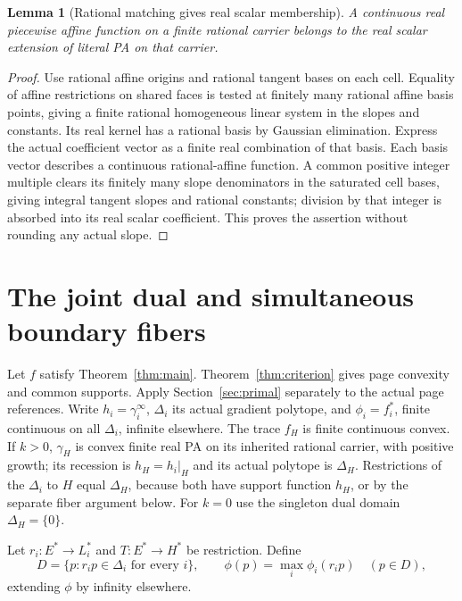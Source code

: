 \documentclass[11pt]{article}
\newtheorem{lemma}[theorem]{Lemma}
\begin{document}
\begin{lemma}[Rational matching gives real scalar membership]\label{lem:scalar}
A continuous real piecewise affine function on a finite rational carrier belongs to the real scalar extension of literal PA on that carrier.
\end{lemma}
\begin{proof}
Use rational affine origins and rational tangent bases on each cell. Equality of affine restrictions on shared faces is tested at finitely many rational affine basis points, giving a finite rational homogeneous linear system in the slopes and constants. Its real kernel has a rational basis by Gaussian elimination. Express the actual coefficient vector as a finite real combination of that basis. Each basis vector describes a continuous rational-affine function. A common positive integer multiple clears its finitely many slope denominators in the saturated cell bases, giving integral tangent slopes and rational constants; division by that integer is absorbed into its real scalar coefficient. This proves the assertion without rounding any actual slope.
\end{proof}

\section{The joint dual and simultaneous boundary fibers}\label{sec:joint}
Let $f$ satisfy Theorem~\ref{thm:main}. Theorem~\ref{thm:criterion} gives page convexity and common supports. Apply Section~\ref{sec:primal} separately to the actual page references. Write $h_i=\gamma_i^\infty$, $\Delta_i$ its actual gradient polytope, and $\phi_i=f_i^*$, finite continuous on all $\Delta_i$, infinite elsewhere. The trace $f_H$ is finite continuous convex. If $k>0$, $\gamma_H$ is convex finite real PA on its inherited rational carrier, with positive growth; its recession is $h_H=h_i|_H$ and its actual polytope is $\Delta_H$. Restrictions of the $\Delta_i$ to $H$ equal $\Delta_H$, because both have support function $h_H$, or by the separate fiber argument below. For $k=0$ use the singleton dual domain $\Delta_H=\{0\}$.

Let $r_i:E^*\to L_i^*$ and $T:E^*\to H^*$ be restriction. Define
\[
 D=\{p:r_ip\in\Delta_i\text{ for every }i\},\qquad
 \phi(p)=\max_i\phi_i(r_ip)\quad(p\in D),
\]
extending $\phi$ by infinity elsewhere.
\end{document}
